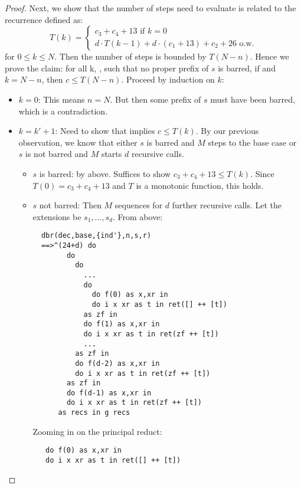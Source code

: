 \begin{proof}
  Next, we show that the number of steps need to evaluate  is related to the recurrence defined as:\\
  \[T(k)= \begin{cases}
    c_3 + c_4 + 13 \text{ if } k = 0\\
    d \cdot T(k-1) + d \cdot (c_1 + 13) + c_2 + 26 \text{ o.w.}
  \end{cases}\]
  for $0 \le k \le N$. Then the number of steps is bounded by $T(N-n)$. Hence we prove the claim: 
  for all k, ,  such that no proper prefix of $s$ is barred, if 
   and $k = N - n$, then $c \le T(N-n)$.
  Proceed by induction on $k$:
  \begin{itemize}
    \item $k= 0$: 
      This means $n = N$. But then some prefix of $s$ must have been barred, which is a contradiction.
    \item $k = k' + 1$: 
      Need to show that  implies $c \le T(k)$.
      By our previous observation, we know that either $s$ is barred and $M$ steps to the base case or $s$ is not barred and $M$ starts $d$ recursive calls. 
      \begin{itemize}
        \item $s$ is barred: 
           by above. Suffices to show
          $c_3 + c_4 + 13 \le T(k)$. Since $T(0) = c_3 + c_4 + 13$ and $T$ is a monotonic function, this holds.
        \item $s$ not barred: 
          Then $M$ sequences for $d$ further recursive calls. Let the extensions be $s_1,\dots,s_d$. From above: 
  \begin{verbatim}
  dbr(dec,base,{ind'},n,s,r) 
  ==>^(24+d) do 
        do 
          do 
            ...
            do 
              do f(0) as x,xr in 
              do i x xr as t in ret([] ++ [t]) 
            as zf in
            do f(1) as x,xr in 
            do i x xr as t in ret(zf ++ [t])
            ...
          as zf in 
          do f(d-2) as x,xr in 
          do i x xr as t in ret(zf ++ [t])
        as zf in 
        do f(d-1) as x,xr in 
        do i x xr as t in ret(zf ++ [t])
      as recs in g recs
  \end{verbatim}
  Zooming in on the principal reduct:
  \begin{verbatim}
   do f(0) as x,xr in 
   do i x xr as t in ret([] ++ [t]) 

\end{verbatim}
\end{itemize}
\end{itemize}
\end{proof}
